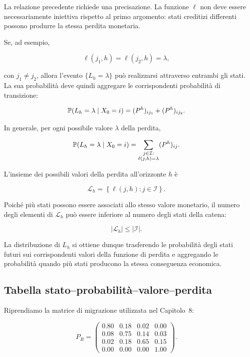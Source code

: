 La relazione precedente richiede una precisazione. La funzione
$\ell$ non deve essere necessariamente iniettiva rispetto al primo
argomento: stati creditizi differenti possono produrre la stessa
perdita monetaria.

Se, ad esempio,

\[
\ell(j_1,h)
=
\ell(j_2,h)
=
\lambda,
\]

con $j_1\neq j_2$, allora l'evento $\{L_h=\lambda\}$ pu\`{o}
realizzarsi attraverso entrambi gli stati. La sua probabilit\`{a}
deve quindi aggregare le corrispondenti probabilit\`{a} di
transizione:

\[
\mathbb{P}(L_h=\lambda\mid X_0=i)
=
(P^h)_{ij_1}
+
(P^h)_{ij_2}.
\]

In generale, per ogni possibile valore $\lambda$ della perdita,

\[
\mathbb{P}(L_h=\lambda\mid X_0=i)
=
\sum_{\substack{j\in\mathcal{I}:\\
\ell(j,h)=\lambda}}
(P^h)_{ij}.
\]

L'insieme dei possibili valori della perdita all'orizzonte $h$ \`{e}

\[
\mathcal{L}_h
=
\left\{
\ell(j,h):
j\in\mathcal{I}
\right\}.
\]

Poich\'{e} pi\`{u} stati possono essere associati allo stesso valore
monetario, il numero degli elementi di $\mathcal{L}_h$ pu\`{o} essere
inferiore al numero degli stati della catena:

\[
\left|\mathcal{L}_h\right|
\leq
\left|\mathcal{I}\right|.
\]

La distribuzione di $L_h$ si ottiene dunque trasferendo le
probabilit\`{a} degli stati futuri sui corrispondenti valori della
funzione di perdita e aggregando le probabilit\`{a} quando pi\`{u}
stati producono la stessa conseguenza economica.

\subsection{Tabella stato--probabilit\`{a}--valore--perdita}

\label{subsec:cap9-tabella-perdite}

Riprendiamo la matrice di migrazione utilizzata nel Capitolo~8:

\[
P_R
=
\begin{pmatrix}
0.80 & 0.18 & 0.02 & 0.00\\
0.08 & 0.75 & 0.14 & 0.03\\
0.02 & 0.18 & 0.65 & 0.15\\
0.00 & 0.00 & 0.00 & 1.00
\end{pmatrix}.
\]

